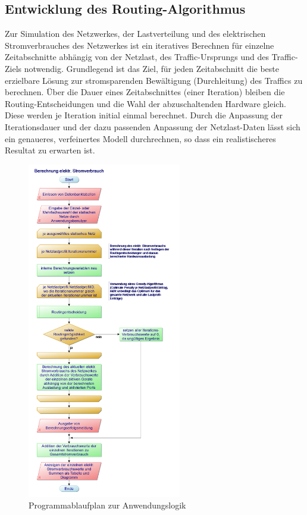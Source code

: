 \documentclass[12pt,titlepage]{article}
\begin{document}
\subsection{Entwicklung des Routing-Algorithmus} \label{subsec:MethAlg}
Zur Simulation des Netzwerkes, der Lastverteilung und des elektrischen Stromverbrauches des Netzwerkes ist ein iteratives Berechnen für einzelne Zeitabschnitte abhängig von der Netzlast, des Traffic-Ursprungs und des Traffic-Ziels notwendig. Grundlegend ist das Ziel, für jeden Zeitabschnitt die beste erzielbare Lösung zur stromsparenden Bewältigung (Durchleitung) des Traffics zu berechnen. Über die Dauer eines Zeitabschnittes (einer Iteration) bleiben die Routing-Entscheidungen und die Wahl der abzuschaltenden Hardware gleich. Diese werden je Iteration initial einmal berechnet. Durch die Anpassung der Iterationsdauer und der dazu passenden Anpassung der Netzlast-Daten lässt sich ein genaueres, verfeinertes Modell durchrechnen, so dass ein realistischeres Resultat zu erwarten ist.
\begin{figure}[!h]
	\centering
	\includegraphics[width=0.6\textwidth]{1Berechnung_elektr_Stromverbrauch}
	\caption{Programmablaufplan zur Anwendungslogik}
	\label{fig:1Berechnung_elektr_Stromverbrauch}
\end{figure}
\end{document}
